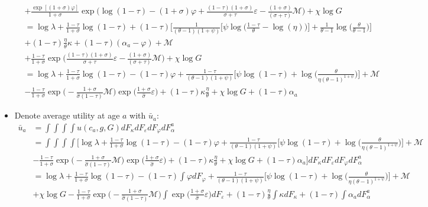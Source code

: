\documentclass{article}
\newcommand{\M}{\mathcal{M}}
\begin{document}
\begin{itemize}
\begin{align*}
&+\frac{\exp[(1+\sigma)\varphi]}{1+\sigma} \exp\Big(  \log (1-\tau) - (1+\sigma)\varphi
+ \frac{(1-\tau)(1+\sigma)}{\sigma+\tau} \varepsilon
- \frac{(1+\sigma)}{(\sigma+\tau)} \M \Big) + \chi \log G\\
&=  \log \lambda + \frac{1-\tau}{1+\sigma} \log (1-\tau) + (1-\tau)\Bigg[ \frac{1}{(\theta- 1)(1+\psi)}\Bigg[\psi \log\Bigg(\frac{1-\tau}{\theta} - \log (\eta) \Bigg)\Bigg] + \frac{1}{\theta - 1}\log\Bigg(\frac{\theta}{\theta-1}\Bigg)\Bigg] \\&+ (1-\tau)\frac{\eta}{\theta}\kappa + (1-\tau)(\alpha_a - \varphi) + \M \\
&+\frac{1-\tau}{1+\sigma} \exp\Big( \frac{(1-\tau)(1+\sigma)}{\sigma+\tau} \varepsilon
- \frac{(1+\sigma)}{(\sigma+\tau)} \M \Big) + \chi \log G\\
&=  \log \lambda + \frac{1-\tau}{1+\sigma} \log (1-\tau)   - (1-\tau)\varphi + \frac{1-\tau}{(\theta- 1)(1+\psi)} \Bigg[\psi \log(1-\tau) + \log\Bigg(\frac{\theta}{\eta (\theta - 1)^{1+\psi}}\Bigg)\Bigg] + \M\\
&- \frac{1-\tau}{1+\sigma}\exp\Bigg(-\frac{1+\sigma}{\hat \sigma(1-\tau)} \M \Bigg) \exp\Bigg(\frac{1+\sigma}{\hat\sigma} \varepsilon \Bigg) + (1-\tau) \kappa \frac{\eta}{\theta}+ \chi \log G + (1-\tau)\alpha_a
\end{align*}
\item Denote average utility at age $a$ with $\bar u_a$:
\begin{align*}
\bar u_a 
&= \int \int \int \int u(c_a, g, G) dF_\kappa dF_\varepsilon dF_\varphi dF_\alpha^a\\
&= \int \int \int \int \Bigg[ \log \lambda + \frac{1-\tau}{1+\sigma} \log (1-\tau)   - (1-\tau)\varphi + \frac{1-\tau}{(\theta- 1)(1+\psi)} \Bigg[\psi \log(1-\tau) + \log\Bigg(\frac{\theta}{\eta (\theta - 1)^{1+\psi}}\Bigg)\Bigg] + \M\\
&- \frac{1-\tau}{1+\sigma}\exp\Bigg(-\frac{1+\sigma}{\hat \sigma(1-\tau)} \M \Bigg) \exp\Bigg(\frac{1+\sigma}{\hat\sigma} \varepsilon \Bigg) + (1-\tau) \kappa \frac{\eta}{\theta}+ \chi \log G + (1-\tau)\alpha_a \Bigg] dF_\kappa dF_\varepsilon dF_\varphi dF_\alpha^a\\
&= \log \lambda + \frac{1-\tau}{1+\sigma} \log (1-\tau)  - (1-\tau) \int \varphi dF_\varphi + \frac{1-\tau}{(\theta- 1)(1+\psi)} \Bigg[\psi \log(1-\tau) + \log\Bigg(\frac{\theta}{\eta (\theta - 1)^{1+\psi}}\Bigg)\Bigg] + \M \\
&+ \chi \log G -   \frac{1-\tau}{1+\sigma}\exp\Bigg(-\frac{1+\sigma}{\hat \sigma(1-\tau)} \M \Bigg) \int\exp\Bigg(\frac{1+\sigma}{\hat\sigma} \varepsilon \Bigg) dF_\varepsilon+   (1-\tau) \frac{\eta}{\theta}\int\kappa dF_\kappa  +  (1-\tau) \int\alpha_a  dF_\alpha^a\\

\end{align*}
\end{itemize}
\end{document}
